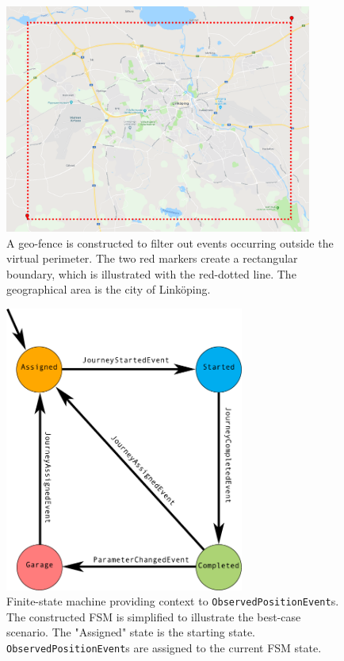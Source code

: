 \begin{figure}[ht!]
    \centering
    \includegraphics[width=0.9\textwidth]{figures/geofencing_linkoping}
    \caption{A geo-fence is constructed to filter out events occurring outside the virtual perimeter.
    The two red markers create a rectangular boundary, which is illustrated with the red-dotted line.
    The geographical area is the city of Linköping.}
    \label{fig:geo-fence}
\end{figure}

\begin{figure}[ht!]
    \centering
    \includegraphics[width=0.7\textwidth]{figures/context-state-machine}
    \caption{Finite-state machine providing context to \texttt{ObservedPositionEvent}s. 
    The constructed FSM is simplified to illustrate the best-case scenario.
    The "Assigned" state is the starting state.
    \texttt{ObservedPositionEvent}s are assigned to the current FSM state.
    }
    \label{fig:context-state-machine}
\end{figure}

